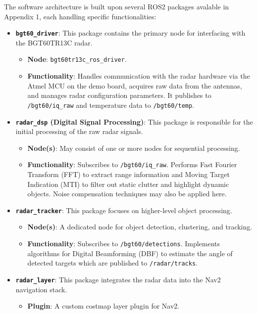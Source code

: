 The software architecture is built upon several ROS2 packages avalable in Appendix 1, each handling specific functionalities:
\begin{itemize}
    \item \textbf{\texttt{bgt60\_driver}}: This package contains the primary node for interfacing with the BGT60TR13C radar.
    \begin{itemize}
        \item \textbf{Node}: \texttt{bgt60tr13c\_ros\_driver}.
        \item \textbf{Functionality}: Handles communication with the radar hardware via the Atmel MCU on the demo board, acquires raw data from the antennas, and manages radar configuration parameters. It publishes to \texttt{/bgt60/iq\_raw} and temperature data to \texttt{/bgt60/temp}.
    \end{itemize}
    \item \textbf{\texttt{radar\_dsp} (Digital Signal Processing)}: This package is responsible for the initial processing of the raw radar signals.
    \begin{itemize}
        \item \textbf{Node(s)}: May consist of one or more nodes for sequential processing.
        \item \textbf{Functionality}: Subscribes to \texttt{/bgt60/iq\_raw}. Performs Fast Fourier Transform (FFT) to extract range information and Moving Target Indication (MTI) to filter out static clutter and highlight dynamic objects. Noise compensation techniques may also be applied here.
    \end{itemize}
    \item \textbf{\texttt{radar\_tracker}}: This package focuses on higher-level object processing.
    \begin{itemize}
        \item \textbf{Node(s)}: A dedicated node for object detection, clustering, and tracking.
        \item \textbf{Functionality}: Subscribes to \texttt{/bgt60/detections}. Implements algorithms for Digital Beamforming (DBF) to estimate the angle of detected targets which are published to \texttt{/radar/tracks}.
    \end{itemize}
    \item \textbf{\texttt{radar\_layer}}: This package integrates the radar data into the Nav2 navigation stack.
    \begin{itemize}
        \item \textbf{Plugin}: A custom costmap layer plugin for Nav2.

\end{itemize}
\end{itemize}
